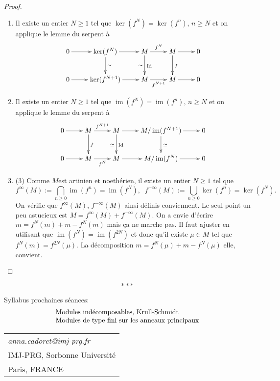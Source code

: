 \documentclass[a4paper, oneside, 12pt]{book}
\theoremstyle{theoremeStyle} %
\theoremstyle{definition} %
\DeclareMathOperator{\im}{im}
\DeclareMathOperator{\Id}{Id}
\begin{document}
\begin{proof}
 \begin{enumerate}
\item   Il existe un entier $N\geq 1$ tel que $\ker(f^N)=\ker(f^n)$, $n\geq N$ et on applique le lemme du serpent à
$$\xymatrix{0\ar[r]& \ker(f^N)\ar[r]\ar[d]^\simeq&M \ar[r]^{f^N}\ar[d]^{\Id}_\simeq&M\ar[r]\ar[d]^f& 0\\
0\ar[r]& \ker(f^{N+1})\ar[r]&M \ar[r]_{f^{N+1}}&M\ar[r]& 0\\}$$
\item   Il existe un entier $N\geq 1$ tel que $\im(f^N)=\im(f^n)$, $n\geq N$ et on applique le lemme du serpent à
$$\xymatrix{0\ar[r]& M\ar[r]^{f^{N+1}}\ar[d]^f&M \ar[r] \ar[d]^{\Id}_\simeq&M/\im(f^{N+1})\ar[r]\ar[d]^\simeq & 0\\
0\ar[r]&M\ar[r]_{f^N}&M \ar[r] &M/\im(f^{N})\ar[r]& 0\\}$$
\item (3) Comme $M $est artinien et noethérien, il existe un entier $N\geq 1$ tel que $$f^{\infty}(M):=\bigcap_{n\geq 0}\im(f^n)=\im(f^N),\; \; f^{-\infty}(M):=\bigcup_{n\geq 0}\ker(f^n)=\ker(f^N).$$
On vérifie que $f^{\infty}(M)$, $f^{-\infty}(M)$ ainsi définis conviennent. Le seul point un peu astucieux est $M=f^{\infty}(M)+f^{-\infty}(M)$. On a envie d'écrire $m=f^N(m)+m-f^N(m)$ mais ça ne marche pas. Il faut ajuster en utilisant que $\im(f^N)=\im(f^{2N})$ et donc qu'il existe $\mu\in M$ tel que $f^N(m)=f^{2N}(\mu)$. La décomposition $m=f^N(\mu)+m-f^N(\mu)$ elle, convient.

\end{enumerate}
\end{proof}


   $$***$$

 Syllabus prochaines séances:\\
$$ \begin{tabular}[t]{l}

Modules indécomposables, Krull-Schmidt\\
Modules de type fini sur les anneaux principaux\\
\end{tabular}$$
  \begin{tabular}[t]{l}
\textit{anna.cadoret@imj-prg.fr}\\
 IMJ-PRG, Sorbonne Université\\
 Paris, FRANCE
\end{tabular}

\clearpage
{}
\printindex
\end{document}
